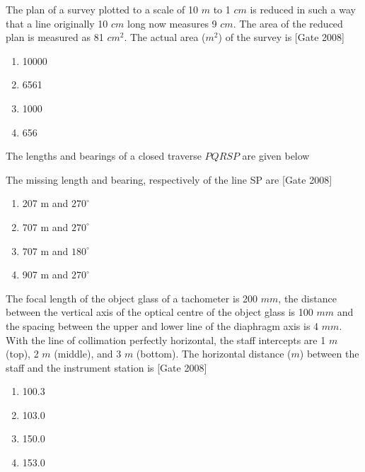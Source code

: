 	\item The plan of a survey plotted to a scale of 10 $m$ to 1 $cm$ is reduced in such a way that a line originally 10 $cm$ long now measures 9 $cm$. The area of the reduced plan is measured as 81 $cm^2$. The actual area ($m^2$) of the survey is  \hfill [Gate 2008]
\begin{multicols}{4}
	\begin{enumerate}
		\item 10000
		\item 6561
		\item 1000
		\item 656
	\end{enumerate}
\end{multicols}	
	\item The lengths and bearings of a closed traverse $PQRSP$ are given below 
		
		
The missing length and bearing, respectively of the line SP are  \hfill [Gate 2008]
\begin{multicols}{2}
	\begin{enumerate}
		\item 207 m and $270^{\circ}$
		\item 707 m and $270^{\circ}$
		\item 707 m and $180^{\circ}$
		\item 907 m and $270^{\circ}$
	\end{enumerate}
\end{multicols}	
 \item The focal length of the object glass of a tachometer is 200 $mm$, the distance between the vertical axis of the optical centre of the object glass is 100 $mm$ and the spacing between the upper and lower line of the diaphragm axis is 4 $mm$. With the line of collimation perfectly horizontal, the staff intercepts are 1 $m$ (top), 2 $m$ (middle), and 3 $m$ (bottom). The horizontal distance ($m$) between the staff and the instrument station is  \hfill [Gate 2008]
	 \begin{multicols}{4}
	\begin{enumerate}
		\item 100.3
		\item 103.0
		\item 150.0
		\item 153.0
	\end{enumerate}
\end{multicols}	


		


